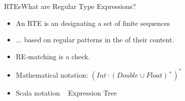 \newsavebox\exnotebox
\begin{lrbox}{\exnotebox}
  \begin{minipage}{6.5cm}
    
  \end{minipage}
\end{lrbox}


\begin{frame}{RTEs}{What are Regular Type Expressions?}
  \begin{itemize}
  \item An RTE is an  designating a set  of finite sequences
  \item ... based on regular patterns in the  of their content.
  \item RE-matching is a  check.
  \item Mathematical notation: $(Int \cdot (Double \cup Float)^+)^*$
  \item Scala notation ~ Expression Tree\\
        \usebox\exnotebox{}\raisebox{-15mm}{\scalebox{0.5}{}}%
  \end{itemize}
\end{frame}
